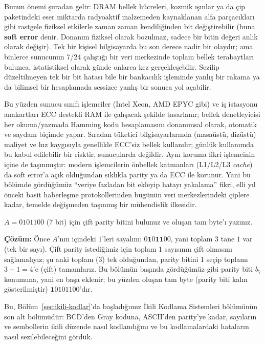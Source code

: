 \begin{detaybilgi}
Bunun önemi şuradan gelir: DRAM bellek hücreleri, kozmik ışınlar ya da çip paketindeki eser
miktarda radyoaktif malzemeden kaynaklanan alfa parçacıkları gibi rastgele fiziksel etkilerle
zaman zaman kendiliğinden bit değiştirebilir (buna \textbf{soft error}
denir. Donanım fiziksel olarak bozulmaz, sadece bir bitin değeri anlık olarak değişir).
Tek bir kişisel bilgisayarda bu son derece nadir bir olaydır; ama binlerce sunucunun 7/24
çalıştığı bir veri merkezinde toplam bellek terabaytları bulunca, istatistiksel olarak günde
onlarca kez gerçekleşebilir. Sezilip düzeltilmeyen tek bir bit hatası bile bir bankacılık
işleminde yanlış bir rakama ya da bilimsel bir hesaplamada sessizce yanlış bir sonuca yol
açabilir.

Bu yüzden sunucu sınıfı işlemciler (Intel Xeon, AMD EPYC gibi) ve iş istasyonu anakartları
ECC destekli RAM ile çalışacak şekilde tasarlanır; bellek denetleyicisi her okuma/yazmada
Hamming kodu hesaplamasını donanımsal olarak, otomatik ve saydam biçimde yapar. Sıradan
tüketici bilgisayarlarında (masaüstü, dizüstü) maliyet ve hız kaygısıyla genellikle ECC'siz
bellek kullanılır; günlük kullanımda bu kabul edilebilir bir risktir, sunucularda değildir.
Aynı koruma fikri işlemcinin içine de taşınmıştır: modern işlemcilerin önbellek katmanları
(L1/L2/L3 \emph{cache}) da soft error'a açık olduğundan sıklıkla parity ya da ECC ile
korunur. Yani bu bölümde gördüğümüz ``veriye fazladan bit ekleyip hatayı yakalama'' fikri,
elli yıl önceki basit haberleşme protokollerinden bugünün veri merkezlerindeki çiplere kadar,
temelde değişmeden taşınmış bir mühendislik ilkesidir.
\end{detaybilgi}

\begin{alistirma}[\kolay]
$A=0101100$ (7 bit) için çift parity bitini bulunuz ve oluşan tam byte'ı yazınız.
\end{alistirma}

\noindent\textbf{Çözüm:} Önce $A$'nın içindeki $1$'leri sayalım: $0\mathbf{1}0\mathbf{1}\mathbf{1}00$,
yani toplam $3$ tane $1$ var (tek bir sayı). Çift parity istediğimiz için toplam $1$
sayısının çift olmasını sağlamalıyız; şu anki toplam ($3$) tek olduğundan, parity bitini
$1$ seçip toplamı $3+1=4$'e (çift) tamamlarız. Bu bölümün başında gördüğümüz gibi parity
biti $b_7$ konumuna, yani en başa eklenir; bu yüzden oluşan tam byte (parity biti kalın
gösterilmiştir) $\mathbf{1}0101100$'dır.

Bu, Bölüm~\ref{sec:ikili-kodlar}'da başladığımız İkili Kodlama Sistemleri
bölümünün son alt bölümüdür: BCD'den
Gray koduna, ASCII'den parity'ye kadar, sayıların ve sembollerin ikili düzende nasıl
kodlandığını ve bu kodlamalardaki hataların nasıl sezilebileceğini gördük.
